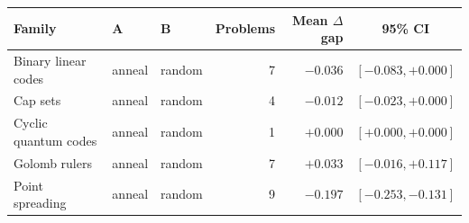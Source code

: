 \begin{tabular}{lllrrc}
\toprule
Family & A & B & Problems & Mean $\Delta$gap & 95\% CI\\
\midrule
Binary linear codes & anneal & random & 7 & $-0.036$ & $[-0.083, +0.000]$\\
Cap sets & anneal & random & 4 & $-0.012$ & $[-0.023, +0.000]$\\
Cyclic quantum codes & anneal & random & 1 & $+0.000$ & $[+0.000, +0.000]$\\
Golomb rulers & anneal & random & 7 & $+0.033$ & $[-0.016, +0.117]$\\
Point spreading & anneal & random & 9 & $-0.197$ & $[-0.253, -0.131]$\\
\bottomrule
\end{tabular}
